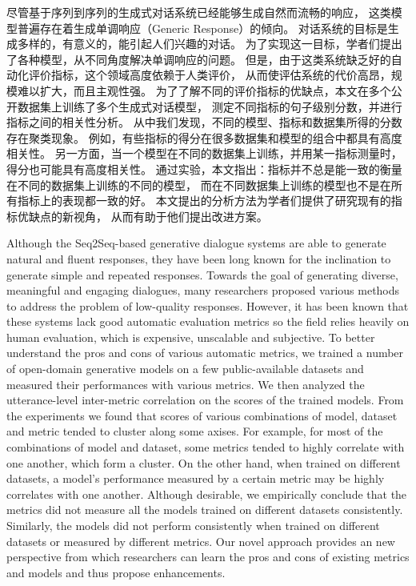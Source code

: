 
\begin{cabstract}
    尽管基于序列到序列的生成式对话系统已经能够生成自然而流畅的响应，
    这类模型普遍存在着生成单调响应（Generic Response）的倾向。
    对话系统的目标是生成多样的，有意义的，能引起人们兴趣的对话。
    为了实现这一目标，学者们提出了各种模型，从不同角度解决单调响应的问题。
    但是，由于这类系统缺乏好的自动化评价指标，这个领域高度依赖于人类评价，
    从而使评估系统的代价高昂，规模难以扩大，而且主观性强。
    为了了解不同的评价指标的优缺点，本文在多个公开数据集上训练了多个生成式对话模型，
    测定不同指标的句子级别分数，并进行指标之间的相关性分析。
    从中我们发现，不同的模型、指标和数据集所得的分数存在聚类现象。
    例如，有些指标的得分在很多数据集和模型的组合中都具有高度相关性。
    另一方面，当一个模型在不同的数据集上训练，并用某一指标测量时，得分也可能具有高度相关性。
    通过实验，本文指出：指标并不总是能一致的衡量在不同的数据集上训练的不同的模型，
    而在不同数据集上训练的模型也不是在所有指标上的表现都一致的好。
    本文提出的分析方法为学者们提供了研究现有的指标优缺点的新视角，
    从而有助于他们提出改进方案。
\end{cabstract}

\begin{eabstract}
    Although the Seq2Seq-based generative dialogue systems are able to generate natural and
    fluent responses,
    they have been long known for the inclination to generate simple and repeated responses.
    Towards the goal of generating diverse, meaningful and engaging dialogues,
    many researchers proposed various methods to address the problem of low-quality responses.
    However, it has been known that these systems lack good automatic evaluation metrics
    so the field relies heavily on human evaluation, which is expensive, unscalable and subjective.
    To better understand the pros and cons of various automatic metrics,
    we trained a number of open-domain generative models on
    a few public-available datasets and measured their performances with various metrics.
    We then analyzed the utterance-level inter-metric correlation on the scores of the trained models.
    From the experiments we found that scores of various combinations of model, dataset and metric
    tended to cluster along some axises.
    For example, for most of the combinations of model and dataset, some metrics tended to highly
    correlate with one another, which form a cluster.
    On the other hand, when trained on different datasets, a model's performance measured by a certain
    metric may be highly correlates with one another.
    Although desirable, we empirically conclude that the metrics did not measure all the models trained
    on different datasets consistently.
    Similarly, the models did not perform consistently when trained on different datasets or measured
    by different metrics. Our novel approach provides an new perspective from which researchers
    can learn the pros and cons of existing metrics and models and thus propose enhancements.
\end{eabstract}
